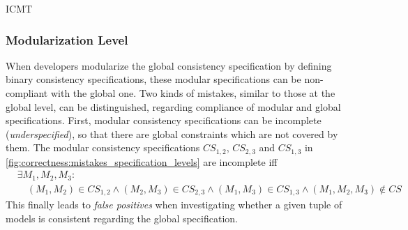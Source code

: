 \begin{copiedFrom}{ICMT}
\subsubsection{Modularization Level}
When developers modularize the global consistency specification by defining binary consistency specifications, these modular specifications can be non-compliant with the global one. 
Two kinds of mistakes, similar to those at the global level, can be distinguished, regarding compliance of modular and global specifications. %
First, modular consistency specifications can be incomplete (\emph{underspecified}), so that there are global constraints which are not covered by them. 
The modular consistency specifications $\mathit{CS}_{1,2}$, $\mathit{CS}_{2,3}$ and $\mathit{CS}_{1,3}$ in \autoref{fig:correctness:mistakes_specification_levels} are incomplete iff
\begin{align*}
    & \exists M_1, M_2, M_3 : \\
    & \hspace{1em} (M_1, M_2) \in \mathit{CS}_{1,2} \land (M_2, M_3) \in \mathit{CS}_{2,3} \land (M_1, M_3) \in \mathit{CS}_{1,3} \land (M_1, M_2, M_3) \not\in \mathit{CS}
\end{align*}
This finally leads to \emph{false positives} when investigating whether a given tuple of models is consistent regarding the global specification. %

\end{copiedFrom}
